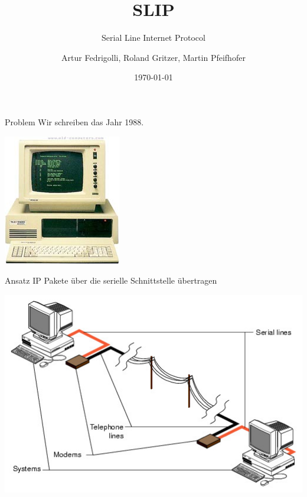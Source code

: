 \documentclass[beamer]{uibk}
\title{SLIP}
\subtitle{Serial Line Internet Protocol}
\author{Artur Fedrigolli, Roland Gritzer, Martin Pfeifhofer }
\date{\today}
\begin{document}
\maketitle

\begin{frame}{Problem}
  Wir schreiben das Jahr 1988.

  \includegraphics[scale=0.5]{1988computer.jpg}

\end{frame}

\begin{frame}{Ansatz}
  IP Pakete über die serielle Schnittstelle  übertragen
  \begin{center}
  \includegraphics[scale=0.5]{ansatz.jpg}
  \end{center}
\end{frame}
\end{document}
